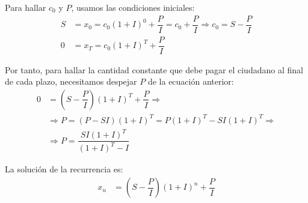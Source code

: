 \begin{ejercicio}
\begin{itemize}
        Para hallar $c_0$ y $P$, usamos las condiciones iniciales:
        \begin{align*}
            S &= x_0 = c_0(1+I)^0 + \dfrac{P}{I} = c_0 + \dfrac{P}{I} \Longrightarrow c_0 = S - \dfrac{P}{I} \\
            0 &= x_T = c_0(1+I)^T + \dfrac{P}{I}
        \end{align*}

        Por tanto, para hallar la cantidad constante que debe pagar el ciudadano al final de cada plazo, necesitamos despejar $P$ de la ecuación anterior:
        \begin{align*}
            0 &= \left(S - \dfrac{P}{I}\right)(1+I)^T + \dfrac{P}{I}
            \Longrightarrow\\&\Longrightarrow P = (P-SI)(1+I)^T = P(1+I)^T - SI(1+I)^T
            \Longrightarrow\\&\Longrightarrow P = \dfrac{SI(1+I)^T}{(1+I)^T - I}
        \end{align*}

        La solución de la recurrencia es:
        \begin{align*}
            x_n &= \left(S - \dfrac{P}{I}\right)(1+I)^n + \dfrac{P}{I}
        \end{align*}
    \end{itemize}

\end{ejercicio}

